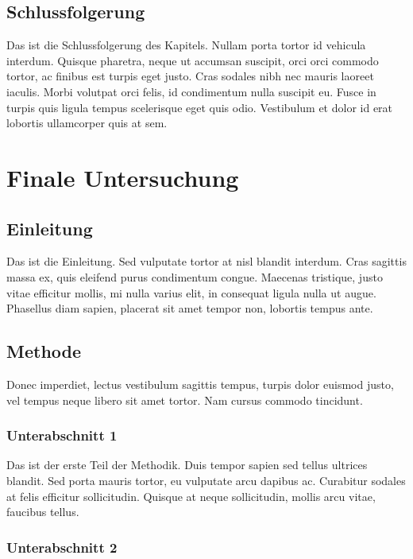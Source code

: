 \documentclass[listof=totoc,index=totoc,bibliography=totoc,12pt,ngerman,a4paper,]{report}
\begin{document}
\section{Schlussfolgerung}\label{schlussfolgerung-2}

Das ist die Schlussfolgerung des Kapitels. Nullam porta tortor id
vehicula interdum. Quisque pharetra, neque ut accumsan suscipit, orci
orci commodo tortor, ac finibus est turpis eget justo. Cras sodales nibh
nec mauris laoreet iaculis. Morbi volutpat orci felis, id condimentum
nulla suscipit eu. Fusce in turpis quis ligula tempus scelerisque eget
quis odio. Vestibulum et dolor id erat lobortis ullamcorper quis at sem.

\chapter{Finale Untersuchung}\label{sec:research-final}

\section{Einleitung}\label{einleitung-4}

Das ist die Einleitung. Sed vulputate tortor at nisl blandit interdum.
Cras sagittis massa ex, quis eleifend purus condimentum congue. Maecenas
tristique, justo vitae efficitur mollis, mi nulla varius elit, in
consequat ligula nulla ut augue. Phasellus diam sapien, placerat sit
amet tempor non, lobortis tempus ante.

\section{Methode}\label{methode-3}

Donec imperdiet, lectus vestibulum sagittis tempus, turpis dolor euismod
justo, vel tempus neque libero sit amet tortor. Nam cursus commodo
tincidunt.

\subsection{Unterabschnitt 1}\label{unterabschnitt-1-2}

Das ist der erste Teil der Methodik. Duis tempor sapien sed tellus
ultrices blandit. Sed porta mauris tortor, eu vulputate arcu dapibus ac.
Curabitur sodales at felis efficitur sollicitudin. Quisque at neque
sollicitudin, mollis arcu vitae, faucibus tellus.

\subsection{Unterabschnitt 2}\label{unterabschnitt-2-3}
\end{document}
